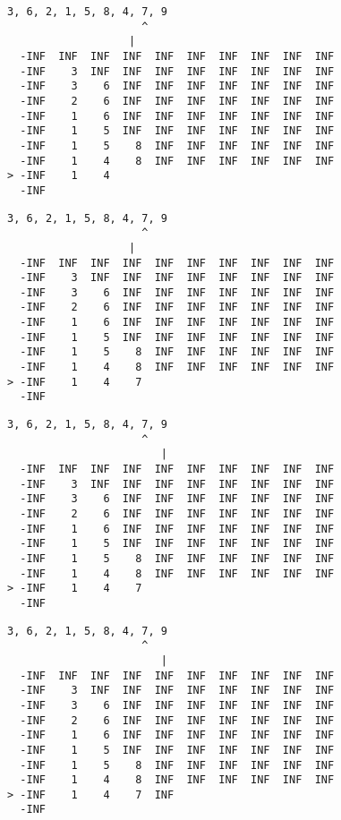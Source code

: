 { \begin{verbatim}
3, 6, 2, 1, 5, 8, 4, 7, 9
                     ^
                   |
  -INF  INF  INF  INF  INF  INF  INF  INF  INF  INF
  -INF    3  INF  INF  INF  INF  INF  INF  INF  INF
  -INF    3    6  INF  INF  INF  INF  INF  INF  INF
  -INF    2    6  INF  INF  INF  INF  INF  INF  INF
  -INF    1    6  INF  INF  INF  INF  INF  INF  INF
  -INF    1    5  INF  INF  INF  INF  INF  INF  INF
  -INF    1    5    8  INF  INF  INF  INF  INF  INF
  -INF    1    4    8  INF  INF  INF  INF  INF  INF
> -INF    1    4                                   
  -INF                                             
\end{verbatim} }

{ \begin{verbatim}
3, 6, 2, 1, 5, 8, 4, 7, 9
                     ^
                   |
  -INF  INF  INF  INF  INF  INF  INF  INF  INF  INF
  -INF    3  INF  INF  INF  INF  INF  INF  INF  INF
  -INF    3    6  INF  INF  INF  INF  INF  INF  INF
  -INF    2    6  INF  INF  INF  INF  INF  INF  INF
  -INF    1    6  INF  INF  INF  INF  INF  INF  INF
  -INF    1    5  INF  INF  INF  INF  INF  INF  INF
  -INF    1    5    8  INF  INF  INF  INF  INF  INF
  -INF    1    4    8  INF  INF  INF  INF  INF  INF
> -INF    1    4    7                              
  -INF                                             
\end{verbatim} }

{ \begin{verbatim}
3, 6, 2, 1, 5, 8, 4, 7, 9
                     ^
                        |
  -INF  INF  INF  INF  INF  INF  INF  INF  INF  INF
  -INF    3  INF  INF  INF  INF  INF  INF  INF  INF
  -INF    3    6  INF  INF  INF  INF  INF  INF  INF
  -INF    2    6  INF  INF  INF  INF  INF  INF  INF
  -INF    1    6  INF  INF  INF  INF  INF  INF  INF
  -INF    1    5  INF  INF  INF  INF  INF  INF  INF
  -INF    1    5    8  INF  INF  INF  INF  INF  INF
  -INF    1    4    8  INF  INF  INF  INF  INF  INF
> -INF    1    4    7                              
  -INF                                             
\end{verbatim} }

{ \begin{verbatim}
3, 6, 2, 1, 5, 8, 4, 7, 9
                     ^
                        |
  -INF  INF  INF  INF  INF  INF  INF  INF  INF  INF
  -INF    3  INF  INF  INF  INF  INF  INF  INF  INF
  -INF    3    6  INF  INF  INF  INF  INF  INF  INF
  -INF    2    6  INF  INF  INF  INF  INF  INF  INF
  -INF    1    6  INF  INF  INF  INF  INF  INF  INF
  -INF    1    5  INF  INF  INF  INF  INF  INF  INF
  -INF    1    5    8  INF  INF  INF  INF  INF  INF
  -INF    1    4    8  INF  INF  INF  INF  INF  INF
> -INF    1    4    7  INF                         
  -INF                                             
\end{verbatim} }

